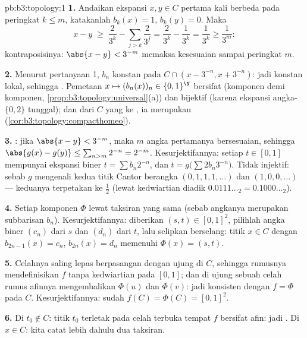 \begin{solution}{pb:b3:topology:1}
\textbf{1.} Andaikan ekspansi $x, y \in C$ pertama kali berbeda
pada peringkat $k \leq m$, katakanlah $b_k(x) = 1$, $b_k(y) = 0$. Maka
\[
x - y \;\geq\; \frac{2}{3^k} - \sum_{j > k}\frac{2}{3^j}
= \frac{2}{3^k} - \frac{1}{3^k} = \frac1{3^k} \geq \frac1{3^m}:
\]
kontraposisinya: $\abs{x - y} < 3^{-m}$ memaksa kesesuaian sampai
peringkat $m$.

\textbf{2.} Menurut pertanyaan 1, $b_n$ konstan pada $C \cap (x -
3^{-n}, x + 3^{-n})$: jadi konstan lokal, sehingga .
Pemetaan $x \mapsto (b_n(x))_n \in \{0,1\}^\N$ bersifat 
(komponen demi komponen, \cref{prop:b3:topology:universal}(a)) dan
bijektif (karena ekspansi angka-$\{0,2\}$ tunggal); dan dari $C$ yang
 ke , ia merupakan 
(\cref{cor:b3:topology:compacthomeo}).

\textbf{3.} : jika $\abs{x - y} < 3^{-m}$, maka $m$ angka
pertamanya bersesuaian, sehingga $\abs{g(x) - g(y)} \leq \sum_{n > m}2^{-n}
= 2^{-m}$. Kesurjektifannya: setiap $t \in [0,1]$ mempunyai ekspansi
biner $t = \sum b_n2^{-n}$, dan $t = g\bigl(\sum
2b_n3^{-n}\bigr)$. Tidak injektif: sebab $g$ mengenali kedua titik
Cantor berangka $(0,1,1,1,\dots)$ dan $(1,0,0,\dots)$ ---
keduanya terpetakan ke $\frac12$ (lewat kedwiartian diadik $0.0111\ldots_2 =
0.1000\ldots_2$).

\textbf{4.} Setiap komponen $\Phi$  lewat taksiran yang sama
(sebab angkanya merupakan subbarisan $b_n$).
Kesurjektifannya: diberikan $(s, t) \in [0,1]^2$, pilihlah angka biner
$(c_n)$ dari $s$ dan $(d_n)$ dari $t$, lalu selipkan berselang: titik $x
\in C$ dengan $b_{2n-1}(x) = c_n$, $b_{2n}(x) = d_n$ memenuhi
$\Phi(x) = (s,t)$.

\textbf{5.} Celahnya saling lepas berpasangan dengan ujung di
$C$, sehingga rumusnya mendefinisikan $f$ tanpa kedwiartian pada $[0,1]$; dan di
ujung sebuah celah rumus afinnya mengembalikan $\Phi(u)$ dan
$\Phi(v)$: jadi konsisten dengan $f = \Phi$ pada $C$. Kesurjektifannya:
sudah $f(C) = \Phi(C) = [0,1]^2$.

\textbf{6.} Di $t_0 \notin C$: titik $t_0$ terletak pada celah terbuka tempat
$f$ bersifat afin: jadi . Di $x \in C$: kita catat lebih dahulu
dua taksiran.


\end{solution}
